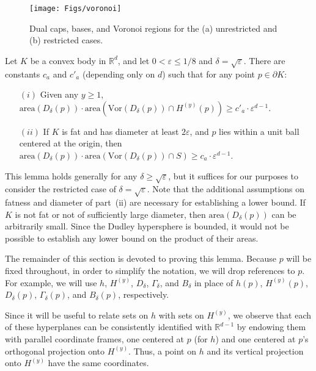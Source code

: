 \documentclass[11pt]{article}   \usepackage[letterpaper,hmargin=2.1cm,vmargin=3cm]{geometry}
\newcommand{\RE}{\mathbb{R}}    \newcommand{\ZZ}{\mathbb{Z}}    \newcommand{\eps}{\varepsilon}  \newcommand{\ST}{\,:\,}         \newcommand{\sq}{\square}
\newcommand{\area}{\mathrm{area}}
\newcommand{\Vor}{\mathrm{Vor}}
\begin{document}
\begin{figure}[htbp]
  \centerline{\texttt{[image: Figs/voronoi]}}
  \caption{Dual caps, bases, and Voronoi regions for the (a) unrestricted and (b) restricted cases.}
  \label{fig:voronoi}
\end{figure}


\begin{lemma} \label{lem:dual}
Let $K$ be a convex body in $\RE^d$, and let $0 < \eps \le 1/8$ and $\delta = \sqrt{\eps}$. There are constants $c_a$ and $c'_a$ (depending only on $d$) such that for any point $p \in \partial K$:
\begin{enumerate}
\item[$(i)$]  Given any $y \ge 1$, $\area(D_{\delta}(p)) \cdot \area(\Vor(D_{\delta}(p)) \cap H^{(y)}(p)) \ge c'_a \cdot \eps^{d-1}$.

\item[$(ii)$] If $K$ is fat and has diameter at least $2 \eps$, and $p$ lies within a unit ball centered at the origin, then $\area(D_{\delta}(p)) \cdot \area(\Vor(D_{\delta}(p)) \cap S) \ge c_a \cdot \eps^{d-1}$.
\end{enumerate}
\end{lemma}


This lemma holds generally for any $\delta \ge \sqrt{\eps}$, but it suffices for our purposes to consider the restricted case of $\delta = \sqrt{\eps}$. Note that the additional assumptions on fatness and diameter of part~(ii) are necessary for establishing a lower bound. If $K$ is not fat or not of sufficiently large diameter, then $\area(D_{\delta}(p))$ can be arbitrarily small. Since the Dudley hypersphere is bounded, it would not be possible to establish any lower bound on the product of their areas. 

The remainder of this section is devoted to proving this lemma. Because $p$ will be fixed throughout, in order to simplify the notation, we will drop references to $p$. For example, we will use $h$, $H^{(y)}$, $D_{\delta}$, $\Gamma_{\delta}$, and $B_{\delta}$ in place of $h(p)$, $H^{(y)}(p)$, $D_{\delta}(p)$, $\Gamma_{\delta}(p)$, and $B_{\delta}(p)$, respectively.

Since it will be useful to relate sets on $h$ with sets on $H^{(y)}$, we observe that each of these hyperplanes can be consistently identified with $\RE^{d-1}$ by endowing them with parallel coordinate frames, one centered at $p$ (for $h$) and one centered at $p$'s orthogonal projection onto $H^{(y)}$. Thus, a point on $h$ and its vertical projection onto $H^{(y)}$ have the same coordinates.
\end{document}
